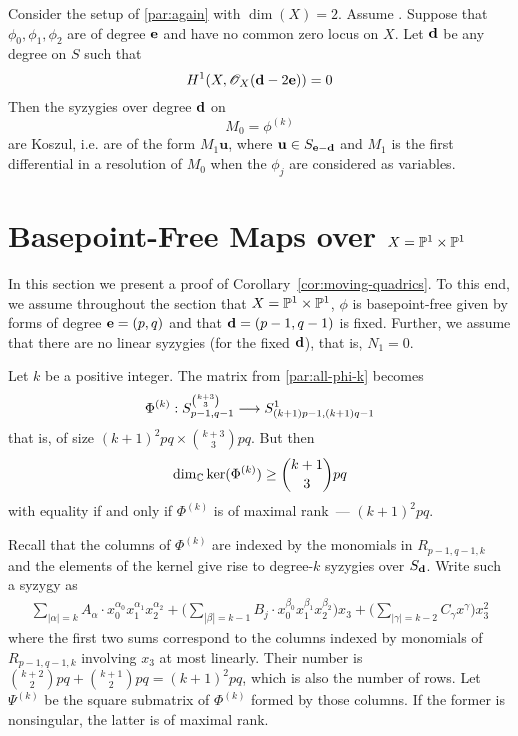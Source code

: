 \documentclass[fleqn,reqno]{amsart}
\begin{document}
\begin{proposition}
\label{prop:koszul-syzygies}
Consider the setup of \eqref{par:again} with $\dim(X)=2$.
Assume .
Suppose that $\phi_0,\phi_1,\phi_2$ are of degree $\mathbf e$ and have no common zero locus on $X$.
Let $\mathbf d$ be any degree on $S$ such that
\[
	H^1(X,\mathscr{O}_X(\mathbf d-2\mathbf e))=0
\]
Then the syzygies over degree $\mathbf d$ on
\[
	M_0=\phi^{(k)}
\]
are Koszul, i.e. are of the form $M_1{\mathbf u}$,
where $\mathbf u\in S_{\mathbf e-\mathbf d}$
and $M_1$ is the first differential in a resolution of $M_0$
when the $\phi_j$ are considered as variables.
\end{proposition}



\section{Basepoint-Free Maps over $X=\mathbb{P}^1\times\mathbb{P}^1$}
\label{sec:moving-quadratics}

\begin{paragraf*}
In this section we present a proof of Corollary~\ref{cor:moving-quadrics}.
To this end, we assume throughout the section that $X=\mathbb{P}^1\times\mathbb{P}^1$,
$\phi$ is basepoint-free given by forms of degree $\mathbf e=(p,q)$
and that $\mathbf d=(p-1,q-1)$ is fixed.
Further, we assume that there are no linear syzygies (for the fixed $\mathbf d$),
that is, $N_1=0$.
\end{paragraf*}

\begin{paragraph}
\label{par:count-rels}
Let $k$ be a positive integer.
The matrix from \eqref{par:all-phi-k} becomes
\[
	\Phi^{(k)}:S_{p-1,q-1}^{\binom{k+3}{3}}\longrightarrow S_{(k+1)p-1,(k+1)q-1}^1
\]
that is, of size $(k+1)^2pq\times\binom{k+3}{3}pq$.
But then
\begin{align}
	\dim_{\mathbb{C}}\ker(\Phi^{(k)})\geq\binom{k+1}{3}pq\label{eqn1}
\end{align}
with equality if and only if $\Phi^{(k)}$ is of maximal rank~--- $(k+1)^2pq$.
\end{paragraph}

\begin{paragraph}
Recall that the columns of $\Phi^{(k)}$ are indexed
by the monomials in $R_{p-1,q-1,k}$
and the elements of the kernel give rise to degree-$k$ syzygies over $S_\mathbf d$.
Write such a syzygy as
\begin{align}\label{ebasi}
	\sum_{|\alpha|=k} A_\alpha\cdot
	x_0^{\alpha_0}x_1^{\alpha_1}x_2^{\alpha_2}+
	\big(\sum_{|\beta|=k-1} B_{j}\cdot
	x_0^{\beta_0}x_1^{\beta_1}x_2^{\beta_2}\big)x_3+
	\big(\sum_{|\gamma|=k-2}C_\gamma x^\gamma\big)x_3^2
\end{align}
where the first two sums correspond to
the columns indexed by monomials of $R_{p-1,q-1,k}$ involving $x_3$ at most linearly.
Their number is $\binom{k+2}{2}pq+\binom{k+1}{2}pq=(k+1)^2pq$,
which is also the number of rows.
Let $\Psi^{(k)}$ be the square submatrix of $\Phi^{(k)}$ formed by those columns.
If the former is nonsingular, the latter is of maximal rank.
\end{paragraph}
\end{document}
